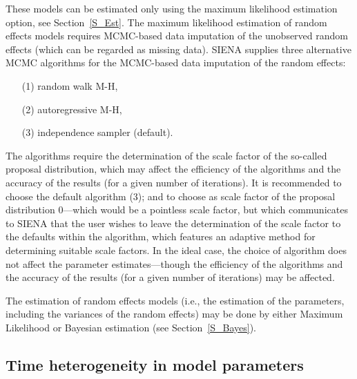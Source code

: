 \documentclass[a4paper,fleqn,11pt]{article}
\newcommand{\+}{\, + \,}
\newcommand{\SI}{{\sf SIENA }}
\begin{document}
{These models can be estimated only using the maximum likelihood
estimation option, see Section~\ref{S_Est}.
The maximum likelihood estimation of random effects models requires
MCMC-based data
imputation of the unobserved random effects (which can be regarded
as missing data).
\SI supplies three alternative MCMC algorithms for the MCMC-based
data imputation of the random effects:
\begin{itemize}
\item[(1)] random walk M-H,
\item[(2)] autoregressive M-H,
\item[(3)] independence sampler (default).
\end{itemize}
The algorithms require the determination of the scale factor of
the so-called proposal distribution,
which may affect the efficiency of the algorithms and
the accuracy of the results (for a given number of iterations).
It is recommended to choose the default algorithm (3);
and to choose as scale factor of the proposal distribution $0$---which
would be a pointless scale factor, but which communicates to \SI
that the user wishes to leave the determination of the scale factor to
the defaults within the algorithm,
which features an adaptive method for determining suitable scale factors.
In the ideal case, the choice of algorithm does not affect the
parameter estimates---though the efficiency of
the algorithms and the accuracy of the results
(for a given number of iterations) may be affected.

The estimation of random effects models
(i.e., the estimation of the parameters,
including the variances of the random effects)
may be done by either Maximum Likelihood
or Bayesian estimation (see Section~\ref{S_Bayes}).

\fi

\subsection{Time heterogeneity in model parameters}
\label{S_timetest1}

}
\end{document}
